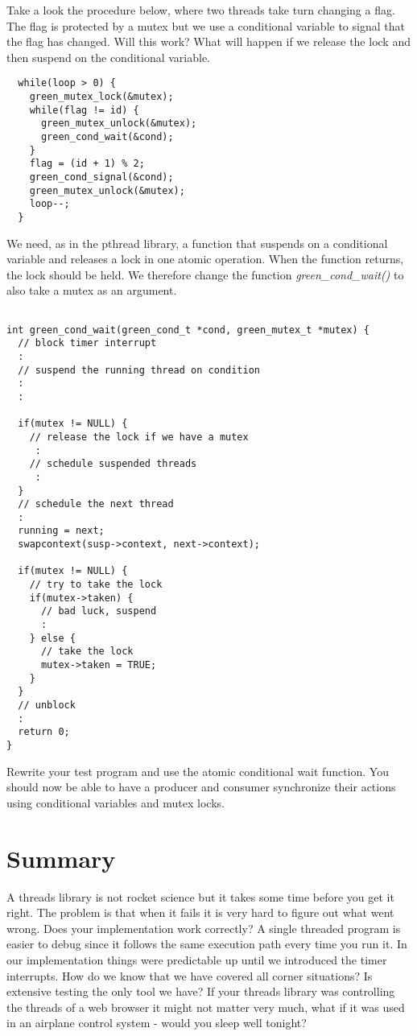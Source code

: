 \documentclass[a4paper,11pt]{article}
\begin{document}
Take a look the procedure below, where two threads take turn changing
a flag. The flag is protected by a mutex but we use a conditional
variable to signal that the flag has changed. Will this work? What
will happen if we release the lock and then suspend on the conditional
variable.

\begin{lstlisting}
  while(loop > 0) {
    green_mutex_lock(&mutex);
    while(flag != id) {
      green_mutex_unlock(&mutex);        
      green_cond_wait(&cond);
    } 
    flag = (id + 1) % 2;
    green_cond_signal(&cond);
    green_mutex_unlock(&mutex);
    loop--;
  }
\end{lstlisting}

We need, as in the pthread library, a function that suspends on a
conditional variable and releases a lock in one atomic operation. When
the function returns, the lock should be held. We therefore change the
function {\em green\_cond\_wait()} to also take a mutex as an argument.

\begin{lstlisting}

int green_cond_wait(green_cond_t *cond, green_mutex_t *mutex) {
  // block timer interrupt
  :
  // suspend the running thread on condition
  :
  :

  if(mutex != NULL) {
    // release the lock if we have a mutex
     :
    // schedule suspended threads
     :
  }
  // schedule the next thread
  :
  running = next;
  swapcontext(susp->context, next->context);

  if(mutex != NULL) {
    // try to take the lock 
    if(mutex->taken) {
      // bad luck, suspend
      :
    } else {
      // take the lock
      mutex->taken = TRUE;
    }
  }
  // unblock
  :
  return 0;
}
\end{lstlisting}

Rewrite your test program and use the atomic conditional wait
function. You should now be able to have a producer and consumer
synchronize their actions using conditional variables and mutex locks.

\section{Summary}

A threads library is not rocket science but it takes some time before
you get it right. The problem is that when it fails it is very hard to
figure out what went wrong. Does your implementation work correctly? A
single threaded program is easier to debug since it follows the same
execution path every time you run it. In our implementation things
were predictable up until we introduced the timer interrupts. How do
we know that we have covered all corner situations? Is extensive testing
the only tool we have? If your threads library was controlling the
threads of a web browser it might not matter very much, what if it was
used in an airplane control system - would you sleep well tonight?
\end{document}
